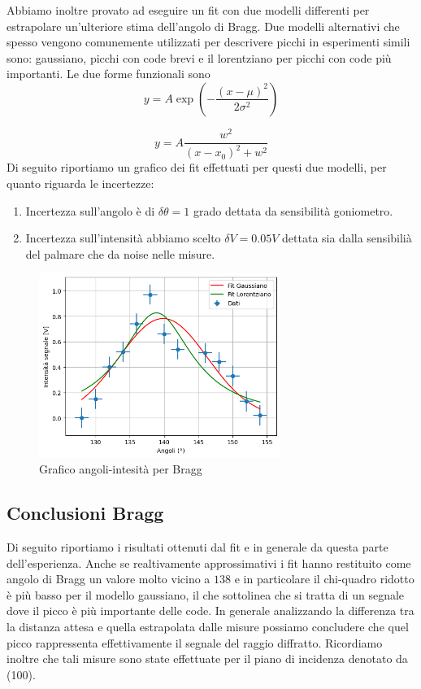 \documentclass[letterpaper,12pt]{article}
\begin{document}
Abbiamo inoltre provato ad eseguire un fit con due modelli differenti per estrapolare un'ulteriore stima dell'angolo di Bragg.
Due modelli alternativi che spesso vengono comunemente utilizzati per descrivere picchi in esperimenti simili sono: gaussiano, picchi con code brevi e il lorentziano per picchi con code più importanti.
Le due forme funzionali sono
\begin{equation}
	y = A \exp\left(-\frac{(x - \mu)^2}{2\sigma^2}\right)
	\end{equation}
	
	\begin{equation}
	y = A \frac{w^2}{(x - x_0)^2 + w^2}
	\end{equation}
Di seguito riportiamo un grafico dei fit effettuati per questi due modelli, per quanto riguarda le incertezze:
\begin{enumerate}
	\item Incertezza sull'angolo è di $\delta\theta= 1$ grado dettata da sensibilità goniometro.
	\item Incertezza sull'intensità abbiamo scelto $\delta V = 0.05 V$ dettata sia dalla sensibilià del palmare che da noise nelle misure.
\end{enumerate}
\begin{figure}[h!]
	\centering
	\includegraphics[width = 0.7\textwidth]{graf_bragg.png}
	\caption{Grafico angoli-intesità per Bragg}
	\label{fig:GraficoBragg}
\end{figure}

\subsection{Conclusioni Bragg}
Di seguito riportiamo i risultati ottenuti dal fit e in generale da questa parte dell'esperienza.
Anche se realtivamente approssimativi i fit hanno restituito come angolo di Bragg un valore molto vicino a $138$
e in particolare il chi-quadro ridotto è più basso per il modello gaussiano, il che sottolinea che si tratta di un segnale dove il picco è più importante delle code.
In generale analizzando la differenza tra la distanza attesa e quella estrapolata dalle misure possiamo concludere che quel picco 
rappressenta effettivamente il segnale del raggio diffratto. Ricordiamo inoltre che tali misure sono state effettuate per il piano di incidenza denotato da 
(100).
\end{document}

